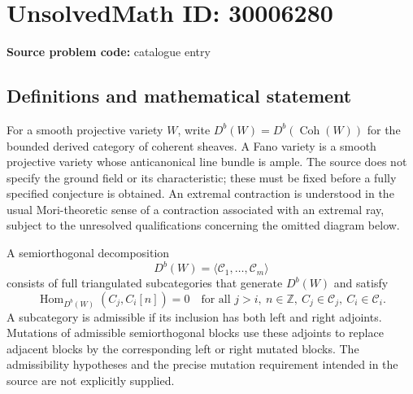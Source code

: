 \documentclass[11pt]{article}
\newcommand{\Z}{\mathbb{Z}}
\begin{document}
\section*{UnsolvedMath ID: 30006280}
\textbf{Source problem code:} catalogue entry
\subsection{Definitions and mathematical statement}
For a smooth projective variety \(W\), write \(D^b(W)=D^b(\operatorname{Coh}(W))\) for the bounded derived category of coherent sheaves. A Fano variety is a smooth projective variety whose anticanonical line bundle is ample. The source does not specify the ground field or its characteristic; these must be fixed before a fully specified conjecture is obtained. An extremal contraction is understood in the usual Mori-theoretic sense of a contraction associated with an extremal ray, subject to the unresolved qualifications concerning the omitted diagram below.

A semiorthogonal decomposition
\[
D^b(W)=\langle\mathcal C_1,\ldots,\mathcal C_m\rangle
\]
consists of full triangulated subcategories that generate \(D^b(W)\) and satisfy
\[
\operatorname{Hom}_{D^b(W)}(C_j,C_i[n])=0
\quad\text{for all }j>i,\ n\in\Z,\ C_j\in\mathcal C_j,\ C_i\in\mathcal C_i.
\]
A subcategory is admissible if its inclusion has both left and right adjoints. Mutations of admissible semiorthogonal blocks use these adjoints to replace adjacent blocks by the corresponding left or right mutated blocks. The admissibility hypotheses and the precise mutation requirement intended in the source are not explicitly supplied.
\end{document}
